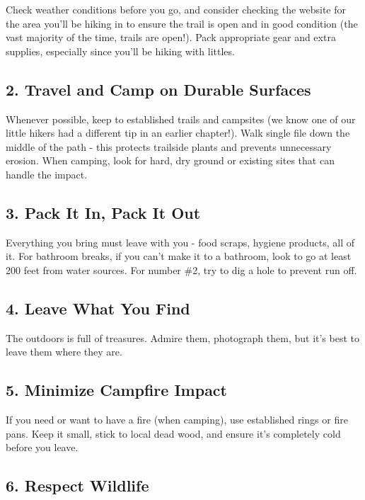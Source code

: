 \documentclass[
  letterpaper,
  DIV=11,
  numbers=noendperiod]{scrreprt}
\begin{document}
Check weather conditions before you go, and consider checking the
website for the area you'll be hiking in to ensure the trail is open and
in good condition (the vast majority of the time, trails are open!).
Pack appropriate gear and extra supplies, especially since you'll be
hiking with littles.

\subsection{2. Travel and Camp on Durable
Surfaces}\label{travel-and-camp-on-durable-surfaces}

Whenever possible, keep to established trails and campsites (we know one
of our little hikers had a different tip in an earlier chapter!). Walk
single file down the middle of the path - this protects trailside plants
and prevents unnecessary erosion. When camping, look for hard, dry
ground or existing sites that can handle the impact.

\subsection{3. Pack It In, Pack It Out}\label{pack-it-in-pack-it-out}

Everything you bring must leave with you - food scraps, hygiene
products, all of it. For bathroom breaks, if you can't make it to a
bathroom, look to go at least 200 feet from water sources. For number
\#2, try to dig a hole to prevent run off.

\subsection{4. Leave What You Find}\label{leave-what-you-find}

The outdoors is full of treasures. Admire them, photograph them, but
it's best to leave them where they are.

\subsection{5. Minimize Campfire Impact}\label{minimize-campfire-impact}

If you need or want to have a fire (when camping), use established rings
or fire pans. Keep it small, stick to local dead wood, and ensure it's
completely cold before you leave.

\subsection{6. Respect Wildlife}\label{respect-wildlife}
\end{document}
